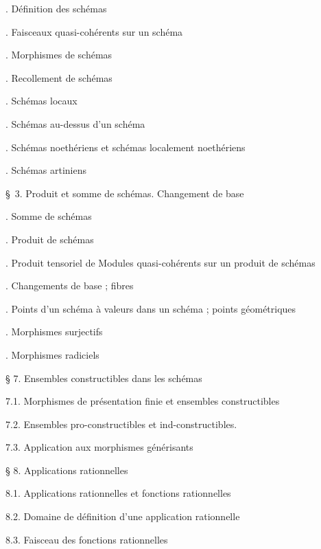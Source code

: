 \noindent{}. Définition des schémas\dotfill

\noindent{}. Faisceaux quasi-cohérents sur un schéma\dotfill

\noindent{}. Morphismes de schémas\dotfill

\noindent{}. Recollement de schémas\dotfill

\noindent{}. Schémas locaux\dotfill

\noindent{}. Schémas au-dessus d'un schéma\dotfill

\noindent{}. Schémas noethériens et schémas localement noethériens\dotfill

\noindent{}. Schémas artiniens\dotfill

\noindent\quad \S\ 3. Produit et somme de schémas. Changement de base\dotfill

\noindent{}. Somme de schémas\dotfill

\noindent{}. Produit de schémas\dotfill

\noindent{}. Produit tensoriel de Modules quasi-cohérents sur un produit de schémas\dotfill

\noindent{}. Changements de base ; fibres\dotfill

\noindent{}. Points d'un schéma à valeurs dans un schéma ; points géométriques\dotfill

\noindent{}. Morphismes surjectifs\dotfill

\noindent{}. Morphismes radiciels\dotfill



\noindent § 7. Ensembles constructibles dans les schémas\dotfill

7.1. Morphismes de présentation finie et ensembles constructibles\dotfill

7.2. Ensembles pro-constructibles et ind-constructibles.

7.3. Application aux morphismes générisants\dotfill

\noindent § 8. Applications rationnelles \dotfill

8.1. Applications rationnelles et fonctions rationnelles

8.2. Domaine de définition d'une application rationnelle

8.3. Faisceau des fonctions rationnelles\dotfill

